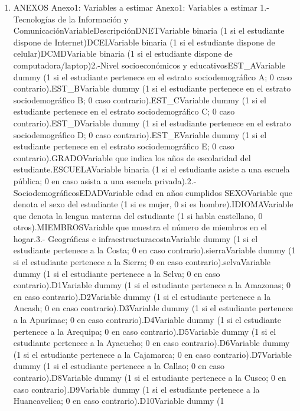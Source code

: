 \begin{enumerate}
\def\labelenumi{\arabic{enumi}.}
\setcounter{enumi}{8}
\tightlist
\item
  ANEXOS Anexo1: Variables a estimar Anexo1: Variables a estimar
  1.-Tecnologías de la Información y
  ComunicaciónVariableDescripciónDNETVariable binaria (1 si el
  estudiante dispone de Internet)DCELVariable binaria (1 si el
  estudiante dispone de celular)DCMDVariable binaria (1 si el estudiante
  dispone de computadora/laptop)2.-Nivel socioeconómicos y
  educativosEST\_AVariable dummy (1 si el estudiante pertenece en el
  estrato sociodemográfico A; 0 caso contrario).EST\_BVariable dummy (1
  si el estudiante pertenece en el estrato sociodemográfico B; 0 caso
  contrario).EST\_CVariable dummy (1 si el estudiante pertenece en el
  estrato sociodemográfico C; 0 caso contrario).EST\_DVariable dummy (1
  si el estudiante pertenece en el estrato sociodemográfico D; 0 caso
  contrario).EST\_EVariable dummy (1 si el estudiante pertenece en el
  estrato sociodemográfico E; 0 caso contrario).GRADOVariable que indica
  los años de escolaridad del estudiante.ESCUELAVariable binaria (1 si
  el estudiante asiste a una escuela pública; 0 en caso asista a una
  escuela privada).2.- SociodemográficosEDADVariable edad en años
  cumplidos SEXOVariable que denota el sexo del estudiante (1 si es
  mujer, 0 si es hombre).IDIOMAVariable que denota la lengua materna del
  estudiante (1 si habla castellano, 0 otros).MIEMBROSVariable que
  muestra el número de miembros en el hogar.3.- Geográficas e
  infraestructuracostaVariable dummy (1 si el estudiante pertenece a la
  Costa; 0 en caso contrario).sierraVariable dummy (1 si el estudiante
  pertenece a la Sierra; 0 en caso contrario).selvaVariable dummy (1 si
  el estudiante pertenece a la Selva; 0 en caso contrario).D1Variable
  dummy (1 si el estudiante pertenece a la Amazonas; 0 en caso
  contrario).D2Variable dummy (1 si el estudiante pertenece a la Ancash;
  0 en caso contrario).D3Variable dummy (1 si el estudiante pertenece a
  la Apurímac; 0 en caso contrario).D4Variable dummy (1 si el estudiante
  pertenece a la Arequipa; 0 en caso contrario).D5Variable dummy (1 si
  el estudiante pertenece a la Ayacucho; 0 en caso contrario).D6Variable
  dummy (1 si el estudiante pertenece a la Cajamarca; 0 en caso
  contrario).D7Variable dummy (1 si el estudiante pertenece a la Callao;
  0 en caso contrario).D8Variable dummy (1 si el estudiante pertenece a
  la Cusco; 0 en caso contrario).D9Variable dummy (1 si el estudiante
  pertenece a la Huancavelica; 0 en caso contrario).D10Variable dummy (1

\end{enumerate}
